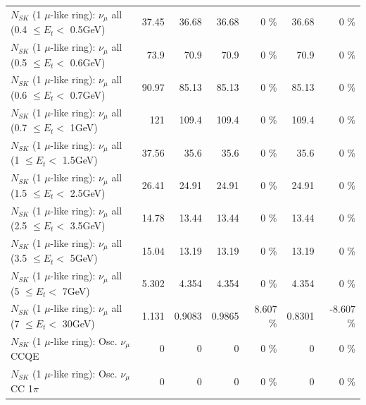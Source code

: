 \begin{table}
\begin{tabular}{| l | r | r | r  r | r  r |}
       $N_{SK}$ (1 $\mu$-like ring): $\nu_{\mu}$ all (0.4 $\leq E_{t} <$ 0.5GeV) &           37.45 &           36.68 &           36.68 &        0 \%  &           36.68 &        0 \%  \\ 
       $N_{SK}$ (1 $\mu$-like ring): $\nu_{\mu}$ all (0.5 $\leq E_{t} <$ 0.6GeV) &            73.9 &            70.9 &            70.9 &        0 \%  &            70.9 &        0 \%  \\ 
       $N_{SK}$ (1 $\mu$-like ring): $\nu_{\mu}$ all (0.6 $\leq E_{t} <$ 0.7GeV) &           90.97 &           85.13 &           85.13 &        0 \%  &           85.13 &        0 \%  \\ 
         $N_{SK}$ (1 $\mu$-like ring): $\nu_{\mu}$ all (0.7 $\leq E_{t} <$ 1GeV) &             121 &           109.4 &           109.4 &        0 \%  &           109.4 &        0 \%  \\ 
         $N_{SK}$ (1 $\mu$-like ring): $\nu_{\mu}$ all (1 $\leq E_{t} <$ 1.5GeV) &           37.56 &            35.6 &            35.6 &        0 \%  &            35.6 &        0 \%  \\ 
       $N_{SK}$ (1 $\mu$-like ring): $\nu_{\mu}$ all (1.5 $\leq E_{t} <$ 2.5GeV) &           26.41 &           24.91 &           24.91 &        0 \%  &           24.91 &        0 \%  \\ 
       $N_{SK}$ (1 $\mu$-like ring): $\nu_{\mu}$ all (2.5 $\leq E_{t} <$ 3.5GeV) &           14.78 &           13.44 &           13.44 &        0 \%  &           13.44 &        0 \%  \\ 
         $N_{SK}$ (1 $\mu$-like ring): $\nu_{\mu}$ all (3.5 $\leq E_{t} <$ 5GeV) &           15.04 &           13.19 &           13.19 &        0 \%  &           13.19 &        0 \%  \\ 
           $N_{SK}$ (1 $\mu$-like ring): $\nu_{\mu}$ all (5 $\leq E_{t} <$ 7GeV) &           5.302 &           4.354 &           4.354 &        0 \%  &           4.354 &        0 \%  \\ 
          $N_{SK}$ (1 $\mu$-like ring): $\nu_{\mu}$ all (7 $\leq E_{t} <$ 30GeV) &           1.131 &          0.9083 &          0.9865 &    8.607 \%  &          0.8301 &   -8.607 \%  \\ 
\hline
\hline
                               $N_{SK}$ (1 $\mu$-like ring): Osc. $\nu_\mu$ CCQE &               0 &               0 &               0 &        0 \%  &               0 &        0 \%  \\ 
                          $N_{SK}$ (1 $\mu$-like ring): Osc. $\nu_\mu$ CC 1$\pi$ &               0 &               0 &               0 &        0 \%  &               0 &        0 \%  \\ 

\end{tabular}
\end{table}
